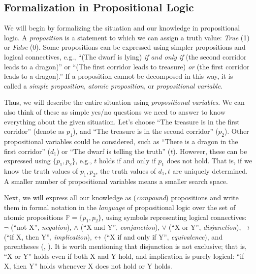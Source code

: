 \subsection{Formalization in Propositional Logic}

We will begin by formalizing the situation and our knowledge in propositional logic. A \emph{proposition} is a statement to which we can assign a truth value: \emph{True} (1) or \emph{False} (0). Some propositions can be expressed using simpler propositions and logical connectives, e.g., ``(The dwarf is lying) \emph{if and only if} (the second corridor leads to a dragon)'' or ``(The first corridor leads to treasure) \emph{or} (the first corridor leads to a dragon).'' If a proposition cannot be decomposed in this way, it is called a \emph{simple proposition}, \emph{atomic proposition}, or \emph{propositional variable}.

Thus, we will describe the entire situation using \emph{propositional variables}. We can also think of these as simple yes/no questions we need to answer to know everything about the given situation. Let's choose ``The treasure is in the first corridor'' (denote as \(p_1\)), and ``The treasure is in the second corridor'' (\(p_2\)). Other propositional variables could be considered, such as ``There is a dragon in the first corridor'' (\(d_1\)) or ``The dwarf is telling the truth'' (\(t\)). However, these can be expressed using \(\{p_1, p_2\}\), e.g., \(t\) holds if and only if \(p_1\) does not hold. That is, if we know the truth values of \(p_1, p_2\), the truth values of \(d_1, t\) are uniquely determined. A smaller number of propositional variables means a smaller search space.

Next, we will express all our knowledge as (\emph{compound}) propositions and write them in formal notation in the \emph{language} of propositional logic over the set of atomic propositions \( \mathbb{P} = \{p_1, p_2\} \), using symbols representing logical connectives: \( \neg \) (``not X'', \emph{negation}), \( \land \) (``X and Y'', \emph{conjunction}), \( \lor \) (``X or Y'', \emph{disjunction}), \( \mathbin{\rightarrow} \) (``if X, then Y'', \emph{implication}), \( \mathbin{\leftrightarrow} \) (``X if and only if Y'', \emph{equivalence}), and parentheses (, ). It is worth mentioning that disjunction is not exclusive; that is, ``X or Y'' holds even if both X and Y hold, and implication is purely logical: ``if X, then Y'' holds whenever X does not hold or Y holds.

